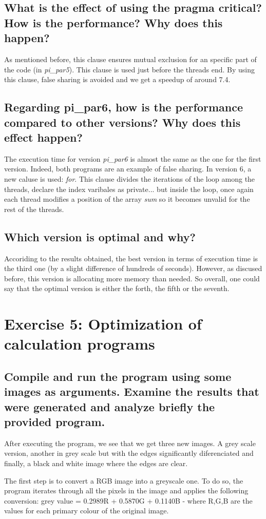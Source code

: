 \documentclass{article}
\newcommand{\question}[1]{\subsection{#1}}
\begin{document}
\question{What is the effect of using the pragma critical? How is the performance? Why does this happen?}

As mentioned before, this clause ensures mutual exclusion for an specific part of the code (in \emph{pi\_par5}). This clause is used just before the threads end. By using this clause, false sharing is avoided and we get a speedup of around 7.4. 

\question{Regarding pi\_par6, how is the performance compared to other versions? Why does this effect happen?}

The execution time for version \emph{pi\_par6} is almost the same as the one for the first version. Indeed, both programs are an example of false sharing. In version 6, a new caluse is used: \emph{for}. This clause divides the iterations of the loop among the threads, declare the index varibales as private... but inside the loop, once again each thread modifies a position of the array \emph{sum} so it becomes unvalid for the rest of the threads.

\question{Which version is optimal and why?} 

Accoriding to the results obtained, the best version in terms of execution time is the third one (by a slight difference of hundreds of seconds). However, as discused before, this version is allocating more memory than needed. So overall, one could say that the optimal version is either the forth, the fifth or the seventh.

\pagebreak

\section{Exercise 5: Optimization	of	calculation	programs}
\setcounter{subsection}{-1}

\question{Compile and run the program using some images as arguments. Examine the results that were generated and analyze briefly the provided program.}

After executing the program, we see that we get three new images. A grey scale version, another in grey scale but with the edges significantly diferenciated and finally, a black and white image where the edges are clear. 

The first step is to convert a RGB image into a greyscale one. To do so, the program iterates through all the pixels in the image and applies the following conversion:  grey value = 0.2989R + 0.5870G + 0.1140B - where R,G,B are the values for each primary colour of the original image.
\end{document}
